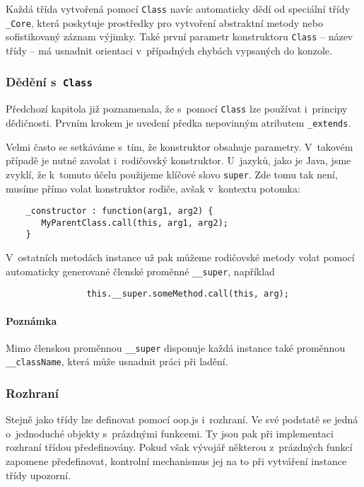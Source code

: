 			Každá třída vytvořená pomocí {\tt Class} navíc automaticky dědí od speciální třídy {\tt \_Core}, která poskytuje prostředky pro vytvoření abstraktní metody nebo sofistikovaný záznam výjimky. Také první parametr konstruktoru {\tt Class} -- název třídy -- má usnadnit orientaci v~případných chybách vypsaných do konzole.
			
		\subsubsection*{Dědění s~{\tt Class}}
			Předchozí kapitola již poznamenala, že s~pomocí {\tt Class} lze používat i~principy dědičnosti. Prvním krokem je uvedení předka nepovinným atributem {\tt \_extends}.
			
			Velmi často se setkáváme s~tím, že konstruktor obsahuje parametry. V~takovém případě je nutné zavolat i~rodičovský konstruktor. U~jazyků, jako je Java, jsme zvyklí, že k~tomuto účelu použijeme klíčové slovo {\tt super}. Zde tomu tak není, musíme přímo volat konstruktor rodiče, avšak v~kontextu potomka:
			\begin{verbatim}
	_constructor : function(arg1, arg2) {
	   MyParentClass.call(this, arg1, arg2);
	}
			\end{verbatim}
			
		 V~ostatních metodách instance už pak můžeme rodičovské metody volat pomocí automaticky generované členské proměnné {\tt \_\_super}, například
			\begin{verbatim}
				this.__super.someMethod.call(this, arg);
			\end{verbatim}
			
			\paragraph{Poznámka}
			Mimo členskou proměnnou {\tt \_\_super} disponuje každá instance také proměnnou {\tt \_\_className}, která může usnadnit práci při ladění.
			
		\subsubsection{Rozhraní}
			Stejně jako třídy lze definovat pomocí {\sf oop.js} i~rozhraní. Ve své podstatě se jedná o~jednoduché objekty s~prázdnými funkcemi. Ty jsou pak při implementaci rozhraní třídou předefinovány. Pokud však vývojář některou z~prázdných funkcí zapomene předefinovat, kontrolní mechanismus jej na to při vytváření instance třídy upozorní.
			
